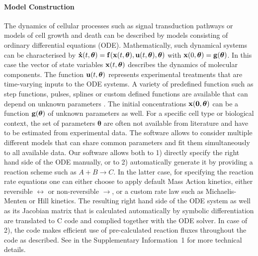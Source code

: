 \documentclass{bioinfo}
\begin{document}
\paragraph{Model Construction}
The dynamics of cellular processes such as signal transduction pathways or models of cell growth and death can be described by models consisting of ordinary differential equations (ODE). Mathematically, such dynamical systems can be characterised by 
${\bf \dot  x}(t,{\boldsymbol \theta}) = {\bf f}({\bf x}(t,{\boldsymbol \theta}),{\bf u}(t,{\boldsymbol \theta}),{\boldsymbol \theta})$
with ${\bf x}(0,{\boldsymbol \theta}) = {\bf g}(\boldsymbol{\theta})$. In this case the vector of state variables ${\bf x}(t,{\boldsymbol \theta})$ describes the dynamics of molecular components. The function ${\bf u}(t,{\boldsymbol \theta})$ represents experimental treatments that are time-varying inputs to the ODE systems. A variety of predefined function such as step functions, pulses, splines or custom defined functions are available that can depend on unknown parameters \citep{Schelker:2012uq}. The initial concentrations ${\bf x(0,{\boldsymbol \theta})}$ can be a function ${\bf g}(\boldsymbol{\theta})$ of unknown parameters as well. For a specific cell type or biological context, the set of parameters ${\boldsymbol \theta}$ are often not available from literature and have to be estimated from experimental data. The software allows to consider multiple different models that can share common parameters and fit them simultaneously to all available data. Our software allows both to 1) directly specify the right hand side of the ODE manually, or to 2) automatically generate it by  providing a reaction scheme such as $A + B \rightarrow C$. In the latter case, for specifying the reaction rate equations one can either choose to apply default Mass Action kinetics, either reversible $\leftrightarrow$ or non-reversible $\rightarrow$, or a custom rate law such as Michaelis-Menten or Hill kinetics. The resulting right hand side of the ODE system as well as its Jacobian matrix that is calculated automatically by symbolic differentiation are translated to C code and complied together with the ODE solver. In case of 2), the code makes efficient use of pre-calculated reaction fluxes throughout the code as described. See in the Supplementary Information~1 for more technical details. 
\end{document}
